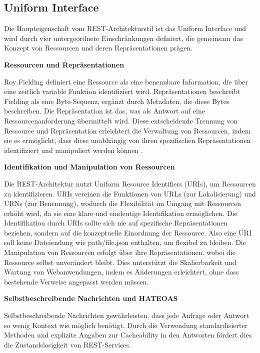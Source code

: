 \documentclass[draft,final]{vutinfth} %
\begin{document}
\subsection{Uniform Interface}

Die Haupteigenschaft vom REST-Architekturstil ist das Uniform Interface und wird durch vier untergeordnete Einschränkungen definiert, die gemeinsam das Konzept von Ressourcen und deren Repräsentationen prägen.

\textbf{{ Ressourcen und Repräsentationen}} 

Roy Fielding definiert eine Ressource als eine benennbare Information, die über eine zeitlich variable Funktion identifiziert wird. 
Repräsentationen beschreibt Fielding als eine Byte-Sequenz, ergänzt durch Metadaten, die diese Bytes beschreiben. Die Repräsentation ist das, was als Antwort auf eine Ressourcenanforderung übermittelt wird.
Diese entscheidende Trennung von Ressource und Repräsentation erleichtert die Verwaltung von Ressourcen, indem sie es ermöglicht, dass diese unabhängig von ihren spezifischen Repräsentationen identifiziert und manipuliert werden können \cite{Fielding:2000:REST}.


\textbf{{ Identifikation und Manipulation von Ressourcen}} 

Die REST-Architektur nutzt Uniform Resource Identifiers (URIs), um Ressourcen zu identifizieren. URIs vereinen die Funktionen von URLs (zur Lokalisierung) und URNs (zur Benennung), wodurch die Flexibilität im Umgang mit Ressourcen erhöht wird, da sie eine klare und eindeutige Identifikation ermöglichen. 
Die Identifikation durch URIs sollte sich nie auf spezifische Repräsentationen beziehen, sondern auf die konzeptuelle Einordnung der Ressource.
Also eine URI soll keine Dateiendung wie \grqq path/file.json\grqq{} enthalten, um flexibel zu bleiben.
Die Manipulation von Ressourcen erfolgt über ihre Repräsentationen, wobei die Ressource selbst unverändert bleibt. 
Dies unterstützt die Skalierbarkeit und Wartung von Webanwendungen, indem es Änderungen erleichtert, ohne dass bestehende Verweise angepasst werden müssen. \cite{Fielding:2000:REST}


\textbf{{ Selbstbeschreibende Nachrichten und HATEOAS}}

Selbstbeschreibende Nachrichten gewährleisten, dass jede Anfrage oder Antwort so wenig Kontext wie möglich benötigt. 
Durch die Verwendung standardisierter Methoden und explizite Angaben zur Cacheability in den Antworten fördert dies die Zustandslosigkeit von REST-Services.
\end{document}
